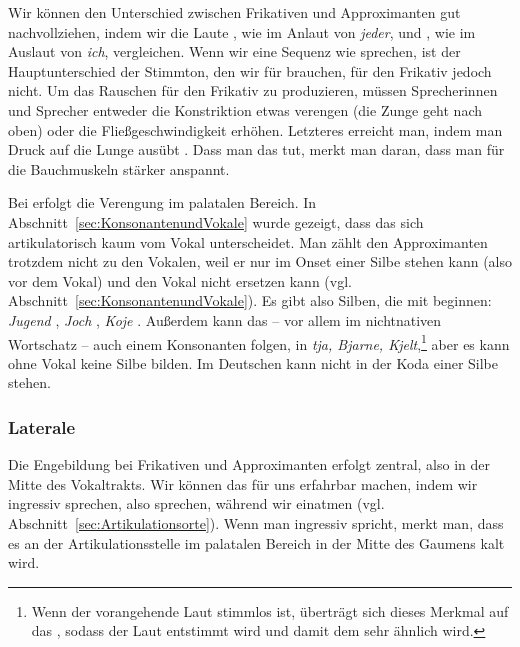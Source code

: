 Wir können den Unterschied zwischen Frikativen und Approximanten gut nachvollziehen, indem wir die Laute \textipa{[j]}, wie im Anlaut von \textit{jeder}, und \textipa{[\c{c}]}, wie im Auslaut von \textit{ich}, vergleichen. Wenn wir eine Sequenz wie \textipa{[\c{c}j\c{c}j]} sprechen, ist der Hauptunterschied der Stimmton, den wir für \textipa{[j]} brauchen, für den Frikativ jedoch nicht. Um das Rauschen für den Frikativ zu produzieren, müssen Sprecherinnen und Sprecher entweder die Konstriktion etwas verengen (die Zunge geht nach oben) oder die Fließgeschwindigkeit erhöhen. Letzteres erreicht man, indem man Druck auf die Lunge ausübt \citep[Abschnitt 1.2]{Pompino-Marschall2020}. Dass man das tut, merkt man daran, dass man für \textipa{[\c{c}]} die Bauchmuskeln stärker anspannt.

Bei \textipa{[j]} erfolgt die Verengung im palatalen Bereich. In Abschnitt~\ref{sec:KonsonantenundVokale} wurde gezeigt, dass das \textipa{[j]} sich artikulatorisch kaum vom Vokal \textipa{[i]} unterscheidet. Man zählt den Approximanten trotzdem nicht zu den Vokalen, weil er nur im Onset einer Silbe stehen kann (also vor dem Vokal) und den Vokal nicht ersetzen kann (vgl. Abschnitt~\ref{sec:KonsonantenundVokale}). Es gibt also Silben, die mit \textipa{[j]} beginnen: \textit{Jugend} \textipa{[\textprimstress ju:.g@nt]}, \textit{Joch} \textipa{[jOX]}, \textit{Koje} \textipa{[\textprimstress ko:.j@]}. Außerdem kann das \textipa{[j]} -- vor allem im nichtnativen Wortschatz -- auch einem Konsonanten folgen, \zB in \textit{tja, Bjarne, Kjelt},\footnote{Wenn der vorangehende Laut stimmlos ist, überträgt sich dieses Merkmal auf das \textipa{[j]}, sodass der Laut entstimmt wird und damit dem \textipa{[\c{c}]} sehr ähnlich wird.} aber es kann ohne Vokal keine Silbe bilden. Im Deutschen kann \textipa{[j]} nicht in der Koda einer Silbe stehen.

\subsubsection{Laterale}
\largerpage
Die Engebildung bei Frikativen und Approximanten erfolgt zentral, also in der Mitte des Vokaltrakts. Wir können das für uns erfahrbar machen, indem wir ingressiv sprechen, also sprechen, während wir einatmen (vgl. Abschnitt~\ref{sec:Artikulationsorte}). Wenn man \textipa{[\c{c}]} ingressiv spricht, merkt man, dass es an der Artikulationsstelle im palatalen Bereich in der Mitte des Gaumens kalt wird. 

